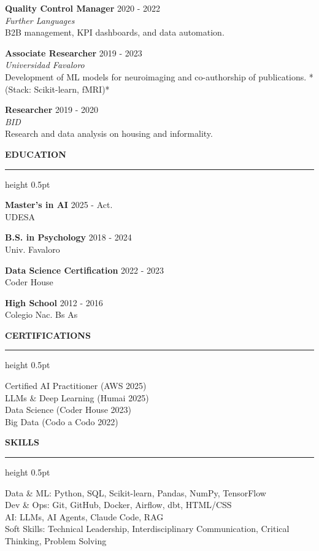 \documentclass[11pt,a4paper]{article}
\newcommand{\cvtitle}[1]{ %
  {\color{primary}\bfseries\large\uppercase{ #1 }}
  {\color{accent}\hrule height 0.5pt}\vspace{6pt}
}
\newcommand{\cvexperience}[4]{ %
  {\bfseries\normalsize\color{primary} #1 } \hfill {\small\color{gray} #3 }\\
  {\small\color{accent}\itshape #2 } \\
  {\small #4 }\par
  \vspace{5pt}
}
\newcommand{\cveducation}[3]{ %
  {\bfseries\small\color{primary} #1 } \hfill {\small\color{gray} #3 }\\
  {\small #2 }\par
}
\begin{document}
\cvexperience{Quality Control Manager}{Further Languages}{2020 - 2022}{B2B management, KPI dashboards, and data automation.}

\cvexperience{Associate Researcher}{Universidad Favaloro}{2019 - 2023}{Development of ML models for neuroimaging and co-authorship of publications. *(Stack: Scikit-learn, fMRI)*}

\cvexperience{Researcher}{BID}{2019 - 2020}{Research and data analysis on housing and informality.}



\begin{minipage}[t]{0.48\textwidth}
\cvtitle{ Education }

\cveducation{Master's in AI}{UDESA}{2025 - Act.}

\cveducation{B.S. in Psychology}{Univ. Favaloro}{2018 - 2024}

\cveducation{Data Science Certification}{Coder House}{2022 - 2023}

\cveducation{High School}{Colegio Nac. Bs As}{2012 - 2016}

\end{minipage}
\hfill
\begin{minipage}[t]{0.48\textwidth}
\cvtitle{ Certifications }
{\normalsize

Certified AI Practitioner (AWS 2025) \\

LLMs \& Deep Learning (Humai 2025) \\

Data Science (Coder House 2023) \\

Big Data (Codo a Codo 2022) \\

}
\end{minipage}

\vspace{8pt}

\cvtitle{ Skills }
{\normalsize

Data & ML: Python, SQL, Scikit-learn, Pandas, NumPy, TensorFlow \\

Dev & Ops: Git, GitHub, Docker, Airflow, dbt, HTML/CSS \\

AI: LLMs, AI Agents, Claude Code, RAG \\

Soft Skills: Technical Leadership, Interdisciplinary Communication, Critical Thinking, Problem Solving \\

}
\end{document}
